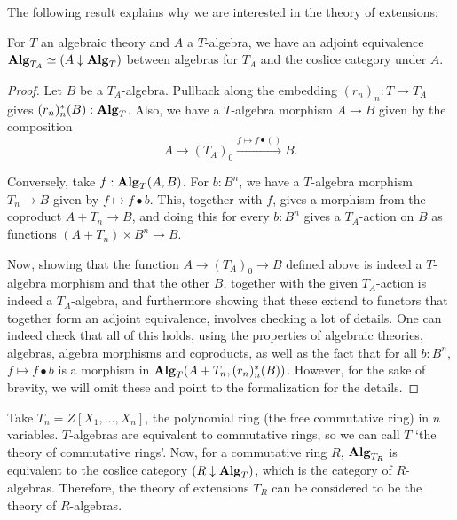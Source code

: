 The following result explains why we are interested in the theory of extensions:
\begin{lemma}\label{lem:extensions-algebra-coslice}
  For $ T $ an algebraic theory and $ A $ a $ T $-algebra, we have an adjoint equivalence $ \mathbf{Alg}_{T_A} \simeq (A \downarrow \mathbf{Alg}_{T}) $ between algebras for $ T_A $ and the coslice category under $ A $.
\end{lemma}
\begin{proof}
  Let $ B $ be a $ T_A $-algebra. Pullback along the embedding $ (r_n)_n : T \to T_A $ gives $ (r_n)_n^*(B) : \mathbf{Alg}_{T} $. Also, we have a $ T $-algebra morphism $ A \to B $ given by the composition
  \[ A \to (T_A)_0 \xrightarrow{f \mapsto f \bullet ()} B. \]

  Conversely, take $ f: \mathbf{Alg}_{T}(A, B) $. For $ b: B^n $, we have a $ T $-algebra morphism $ T_n \to B $ given by $ f \mapsto f \bullet b $. This, together with $ f $, gives a morphism from the coproduct $ A + T_n \to B $, and doing this for every $ b: B^n $ gives a $ T_A $-action on $ B $ as functions $ (A + T_n) \times B^n \to B $.

  Now, showing that the function $ A \to (T_A)_0 \to B $ defined above is indeed a $ T $-algebra morphism and that the other $ B $, together with the given $ T_A $-action is indeed a $ T_A $-algebra, and furthermore showing that these extend to functors that together form an adjoint equivalence, involves checking a lot of details. One can indeed check that all of this holds, using the properties of algebraic theories, algebras, algebra morphisms and coproducts, as well as the fact that for all $ b : B^n $, $ f \mapsto f \bullet b $ is a morphism in $ \mathbf{Alg}_{T}(A + T_n, (r_n)_n^*(B)) $. However, for the sake of brevity, we will omit these and point to the formalization for the details.
\end{proof}

\begin{example}
  Take $ T_n = Z[X_1, \dots, X_n] $, the polynomial ring (the free commutative ring) in $ n $ variables. $ T $-algebras are equivalent to commutative rings, so we can call $ T $ `the theory of commutative rings'. Now, for a commutative ring $ R $, $ \mathbf{Alg}_{T_R} $ is equivalent to the coslice category $ (R \downarrow \mathbf{Alg}_{T}) $, which is the category of $ R $-algebras. Therefore, the theory of extensions $ T_R $ can be considered to be the theory of $ R $-algebras.
\end{example}

